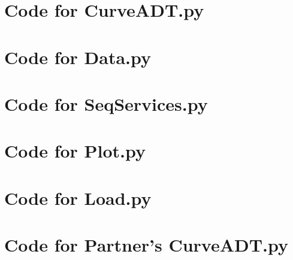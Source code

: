 \documentclass[12pt]{article}
\begin{document}
\newpage

\lstset{language=Python, basicstyle=\tiny, breaklines=true, showspaces=false,
  showstringspaces=false, breakatwhitespace=true}

\def\thesection{\Alph{section}}

\section{Code for CurveADT.py}

\noindent 

\newpage

\section{Code for Data.py}

\noindent 

\newpage

\section{Code for SeqServices.py}

\noindent 

\newpage

\section{Code for Plot.py}

\noindent 

\newpage

\section{Code for Load.py}

\noindent 

\newpage

\section{Code for Partner's CurveADT.py}

\noindent 

\end{document}

